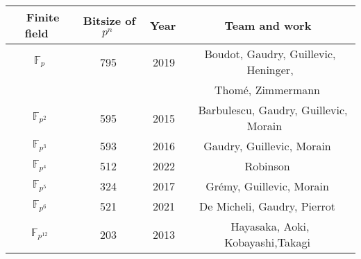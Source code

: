 \documentclass[preview]{standalone}
\begin{document}
\begin{center}
\begin{tabular}{|c|c|c|c|}
   \hline
     $ \,$ Finite field $ \,$ &$ \,$Bitsize of $p^n \,$ &$ \,$ Year$ \,$& $ \,$Team and work $ \,$\\
     \hline
     $\mathbb{F}_p$ & 795 & 2019 & Boudot, Gaudry, Guillevic, Heninger, \\
     &&&Thom\'{e}, Zimmermann~\cite{C:BGGHTZ20}\\ 
     $\mathbb{F}_{p^2}$ &  595 & 2015 & $ \,$ Barbulescu, Gaudry, Guillevic, Morain~\cite{EC:BGGM15} $\,$ \\ 
     $\mathbb{F}_{p^3}$ & 593 & 2016 & Gaudry, Guillevic, Morain~\cite{GaGuMo16email}\\ 
     $\mathbb{F}_{p^4}$ & 512& 2022 & Robinson~\cite{DBLP:journals/corr/abs-2212-04999} \\ 
      $\mathbb{F}_{p^5}$ & 324& 2017 & Gr\'{e}my, Guillevic, Morain~\cite{gremy:hal-01568373}\\ 
      $\mathbb{F}_{p^6}$ & 521& 2021 & De Micheli, Gaudry, Pierrot~\cite{AC:DeMGauPie21}\\
      $\mathbb{F}_{p^{12}}$ & 203& 2013 &Hayasaka, Aoki, Kobayashi,Takagi~\cite{Kenichiro:Hayasaka2014}\\
     \hline
   \end{tabular}
\end{center}
\end{document}
